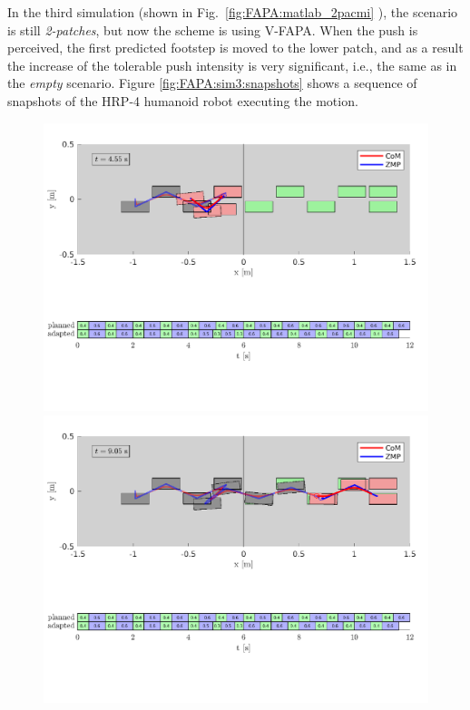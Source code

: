 In the third simulation (shown in Fig.~\ref{fig:FAPA:matlab_2pacmi} ),
the scenario is still {\em 2-patches}, but now the scheme is using V-FAPA.
When the push is perceived, the first predicted footstep is moved to the lower
patch, and as a result the increase of the tolerable push intensity is very
significant, i.e., the same as in the {\em empty} scenario.
Figure \ref{fig:FAPA:sim3:snapshots} shows a sequence of snapshots of
the HRP-4 humanoid robot executing the motion.
\begin{figure}
    \centering
    \includegraphics[trim={0 5.9cm 0 0.7cm},clip,width=\textwidth]{figures/two-patches-mixed-integer-after-push.pdf}
    \includegraphics[trim={0 5.9cm 0 0.7cm},clip,width=\textwidth]{figures/two-patches-mixed-integer-completing-task.pdf}

\end{figure}

